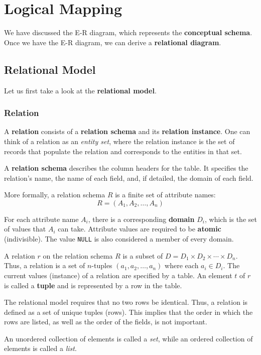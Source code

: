 \chapter{Logical Mapping}

We have discussed the E-R diagram, which represents the \textbf{conceptual schema}. Once we have the E-R diagram, we can derive a \textbf{relational diagram}.  

\section{Relational Model}
Let us first take a look at the \textbf{relational model}.  

\subsection{Relation}
A \textbf{relation} consists of a \textbf{relation schema} and its \textbf{relation instance}. One can think of a relation as an \emph{entity set}, where the relation instance is the set of records that populate the relation and corresponds to the entities in that set.  

A \textbf{relation schema} describes the column headers for the table. It specifies the relation's name, the name of each field, and, if detailed, the domain of each field. 

More formally, a relation schema \(R\) is a finite set of attribute names:  
\[
R = (A_1, A_2, \dots, A_n)
\]  

For each attribute name \(A_i\), there is a corresponding \textbf{domain} \(D_i\), which is the set of values that \(A_i\) can take. Attribute values are required to be \textbf{atomic} (indivisible). The value \texttt{NULL} is also considered a member of every domain.

A relation \(r\) on the relation schema \(R\) is a subset of \(D = D_1 \times D_2 \times \cdots \times D_n\). Thus, a relation is a set of \(n\)-tuples \((a_1, a_2, \dots, a_n)\) where each \(a_i \in D_i\). The current values (instance) of a relation are specified by a table. An element \(t\) of \(r\) is called a \textbf{tuple} and is represented by a row in the table.

The relational model requires that no two rows be identical. Thus, a relation is defined as a set of unique tuples (rows). This implies that the order in which the rows are listed, as well as the order of the fields, is not important.

\begin{remark}
An unordered collection of elements is called a \emph{set}, while an ordered collection of elements is called a \emph{list}.
\end{remark}

